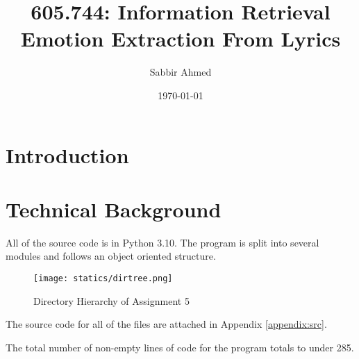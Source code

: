 \documentclass[11pt]{article}
\title{605.744: Information Retrieval \\ Emotion Extraction From Lyrics}
\author{Sabbir Ahmed}
\date{\today}
\begin{document}
\maketitle
\tableofcontents
\clearpage
\newpage

\section{Introduction}

\section{Technical Background}
All of the source code is in Python 3.10. The program is split into several modules and follows an object oriented structure.


\begin{figure}[!ht]
  \centering
  \texttt{[image: statics/dirtree.png]}
  \caption{Directory Hierarchy of Assignment 5}
\end{figure}

The source code for all of the files are attached in Appendix \ref{appendix:src}.

The total number of non-empty lines of code for the program totals to under 285.


\end{document}
